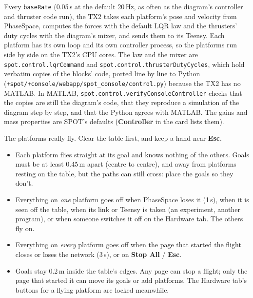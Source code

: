 \documentclass[11pt,a4paper]{article}
\newcommand{\ui}[1]{\textsf{\textbf{#1}}}
\newcommand{\pth}[1]{\texttt{#1}}
\newcommand{\fn}[1]{\texttt{#1}}
\begin{document}
Every \texttt{baseRate} (0.05\,s at the default 20\,Hz, as often as the diagram's controller and thruster code
run), the TX2 takes each platform's pose and velocity from PhaseSpace, computes the forces with the default LQR
law and the thrusters' duty cycles with the diagram's mixer, and sends them to its Teensy. Each platform has its
own loop and its own controller process, so the platforms run side by side on the TX2's CPU cores. The law and
the mixer are \fn{spot.control.lqrCommand} and \fn{spot.control.thrusterDutyCycles}, which hold verbatim copies
of the blocks' code, ported line by line to Python (\pth{+spot/\allowbreak{}+console/\allowbreak{}webapp/\allowbreak{}spot\_console/\allowbreak{}control.py})
because the TX2 has no MATLAB. In MATLAB, \fn{spot.control.\allowbreak{}verifyConsoleController} checks that the
copies are still the diagram's code, that they reproduce a simulation of the diagram step by step, and that the
Python agrees with MATLAB. The gains and mass properties are SPOT's defaults (\ui{Controller} in the card lists them).
\begin{warnbox}
The platforms really fly. Clear the table first, and keep a hand near \textbf{Esc}.
\begin{itemize}
  \item Each platform flies straight at its goal and knows nothing of the others. Goals must be at least
        0.45\,m apart (centre to centre), and away from platforms resting on the table, but the paths can still
        cross: place the goals so they don't.
  \item Everything on \emph{one} platform goes off when PhaseSpace loses it (1\,s), when it is seen off the
        table, when its link or Teensy is taken (an experiment, another program), or when someone switches it off
        on the Hardware tab. The others fly on.
  \item Everything on \emph{every} platform goes off when the page that started the flight closes or loses the
        network (3\,s), or on \ui{Stop All} / \textbf{Esc}.
  \item Goals stay 0.2\,m inside the table's edges. Any page can stop a flight; only the page that started it can
        move its goals or add platforms. The Hardware tab's buttons for a flying platform are locked meanwhile.
\end{itemize}
\end{warnbox}
\end{document}

